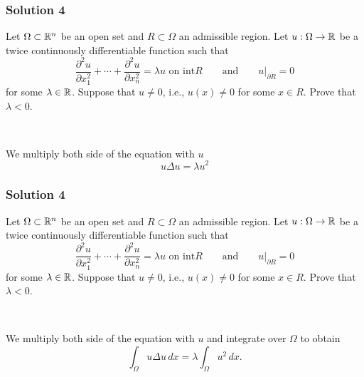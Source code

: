 \documentclass[10pt, t, allowdisplaybreaks]{beamer}
\newcommand{\nullspacesmall}{~\vspace{1em}}
\newcommand{\at}[3]{\left.#1\right\vert_{#2}^{#3}}
\begin{document}
\begin{frame}
    \frametitle{Solution 4}
    \par Let $\Omega\subset \mathbb{R}^n$ be an open set and $R\subset \Omega$ an admissible region. Let $u:\Omega\rightarrow\mathbb{R}$ be a twice continuously differentiable 
    function such that 
    \begin{equation*}
        \frac{\partial^2 u}{\partial x^2_1} + \cdots + \frac{\partial^2 u}{\partial x^2_n} = \lambda u\text{ on int}R\qquad \text{and}\qquad \at{u}{\partial R}{} = 0
    \end{equation*}
    for some $\lambda\in\mathbb{R}$. Suppose that $u\neq 0$, i.e., $u(x)\neq 0$ for some $x\in R$. Prove that $\lambda<0$.

    \nullspacesmall

    \par We multiply both side of the equation with $u$
    \begin{equation*}
        u\Delta u = \lambda u^2
    \end{equation*}
\end{frame}
\begin{frame}
    \frametitle{Solution 4}
    \par Let $\Omega\subset \mathbb{R}^n$ be an open set and $R\subset \Omega$ an admissible region. Let $u:\Omega\rightarrow\mathbb{R}$ be a twice continuously differentiable 
    function such that 
    \begin{equation*}
        \frac{\partial^2 u}{\partial x^2_1} + \cdots + \frac{\partial^2 u}{\partial x^2_n} = \lambda u\text{ on int}R\qquad \text{and}\qquad \at{u}{\partial R}{} = 0
    \end{equation*}
    for some $\lambda\in\mathbb{R}$. Suppose that $u\neq 0$, i.e., $u(x)\neq 0$ for some $x\in R$. Prove that $\lambda<0$.

    \nullspacesmall

    \par We multiply both side of the equation with $u$ and integrate over $\Omega$ to obtain 
    \begin{equation*}
        \int_\Omega u\Delta u\,dx = \lambda\int_\Omega u^2\,dx.
    \end{equation*}
\end{frame}
\end{document}
